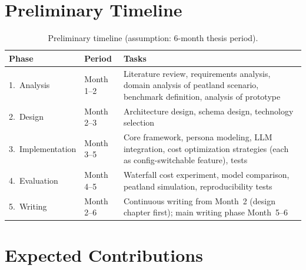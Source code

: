 \documentclass[12pt, a4paper]{article}
\begin{document}
\section{Preliminary Timeline}

\begin{table}[h!]
    \centering
    \begin{tabularx}{\textwidth}{llX}
        \toprule
        \textbf{Phase} & \textbf{Period} & \textbf{Tasks} \\
        \midrule
        1.\ Analysis
            & Month 1--2
            & Literature review, requirements analysis, domain analysis of peatland scenario, benchmark definition, analysis of prototype \\
        2.\ Design
            & Month 2--3
            & Architecture design, schema design, technology selection \\
        3.\ Implementation
            & Month 3--5
            & Core framework, persona modeling, LLM integration, cost optimization strategies (each as config-switchable feature), tests \\
        4.\ Evaluation
            & Month 4--5
            & Waterfall cost experiment, model comparison, peatland simulation, reproducibility tests \\
        5.\ Writing
            & Month 2--6
            & Continuous writing from Month~2 (design chapter first); main writing phase Month~5--6 \\
        \bottomrule
    \end{tabularx}
    \caption{Preliminary timeline (assumption: 6-month thesis period).}
    \label{tab:timeline}
\end{table}

\section{Expected Contributions}
\end{document}
